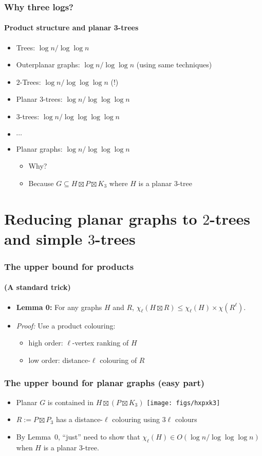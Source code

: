 \documentclass[xcolor=dvipsnames]{beamer}
\begin{document}
\begin{frame}
  \frametitle{Why three logs?}
  \framesubtitle{Product structure and planar 3-trees}
  \begin{itemize}[<+->]
    \item Trees: $\log n/\log\log n$
    \item Outerplanar graphs: $\log n/\log\log n$ (using same techniques)
    \item $2$-Trees: $\log n/\log\log\log n$ \alert{(!)}
    \item Planar $3$-trees: $\log n/\log\log\log n$
    \item $3$-trees: $\log n/\log\log\log\log n$
    \item[]$\cdots$
    \item Planar graphs: $\log n/\log\log\log n$
    \begin{itemize}[<+->]
      \item Why?
      \item Because $G\subseteq H\boxtimes P\boxtimes K_3$ where $H$ is a planar 3-tree
    \end{itemize}
  \end{itemize}
\end{frame}

\section{Reducing planar graphs to $2$-trees and simple $3$-trees}

\begin{frame}
  \frametitle{The upper bound for products}
  \framesubtitle{(A standard trick)}

  \begin{itemize}
    \item \textbf{Lemma 0:} For any graphs $H$ and $R$, $\chi_\ell(H\boxtimes R) \le \chi_\ell(H)\times \chi(R^\ell)$.
    \item[] \textit{Proof:} Use a product colouring:
    \begin{itemize}
      \item high order: $\ell$-vertex ranking of $H$
      \item low order: distance-$\ell$ colouring of $R$
    \end{itemize}
  \end{itemize}
\end{frame}

\begin{frame}
  \frametitle{The upper bound for planar graphs (easy part)}
  \begin{itemize}
    \item Planar $G$ is contained in $H\boxtimes (P\boxtimes K_3)$
    \texttt{[image: figs/hxpxk3]}
    \item $R:=P\boxtimes P_3$ has a distance-$\ell$ colouring using $3\ell$ colours
    \item By Lemma~0, ``just'' need to show that $\chi_\ell(H)\in O(\log n/\log\log\log n)$ when $H$ is a planar $3$-tree.
  \end{itemize}
\end{frame}
\end{document}
